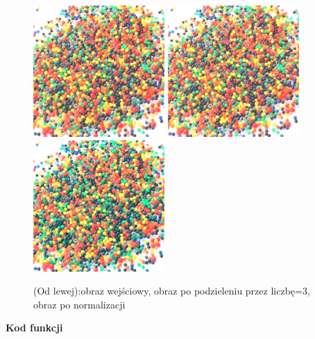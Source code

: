 \documentclass[magisterska,openany]{pracadypl}
\begin{document}
\begin{figure}[h]
\centering
\includegraphics[width=5cm, height=5cm]{orgi/RGBkulki.jpg}
\includegraphics[width=5cm, height=5cm]{4_7/divconstRGB2.jpg}
\includegraphics[width=5cm, height=5cm]{4_7/ndivconstRGB2.jpg}
\caption{(Od lewej):obraz wejściowy, obraz po podzieleniu przez liczbę=3,
obraz po normalizacji}
\end{figure}

\newpage
\textbf{\Large Kod funkcji}
   
\end{document}
